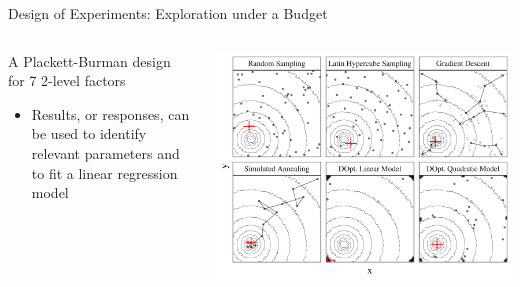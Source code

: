 \documentclass[11pt, compress, aspectratio=169, xcolor={table,usenames,dvipsnames}]{beamer}
\begin{document}
\begin{frame}
\begin{columns}
\begin{column}{0.89\columnwidth}
\begin{columns}
\begin{column}[t]{0.48\columnwidth}
\begin{block}{Design of Experiments: Exploration under a Budget}
\begin{itemize}
\vspace{1em}
\end{itemize}
\begin{columns}
\begin{column}{0.39\columnwidth}
{\scriptsize

}
\begin{center}
{\tiny
A \alert{Plackett-Burman} design \\[-0.5em] for \alert{7 2-level factors}
}
\end{center}
\vspace{0.2em}
\begin{itemize}
\item \alert{Results}, or \alert{responses}, can be used to
identify \alert{relevant parameters} and to \alert{fit a linear regression
model}
\end{itemize}
\end{column}
\begin{column}{0.59\columnwidth}
\begin{center}
\begin{center}
\includegraphics[width=0.98\columnwidth]{../../../img/sampling_comparison.pdf}
\end{center}
\end{center}


\end{column}
\end{columns}
\end{block}
\end{column}
\end{columns}
\end{column}
\end{columns}
\end{frame}
\end{document}
